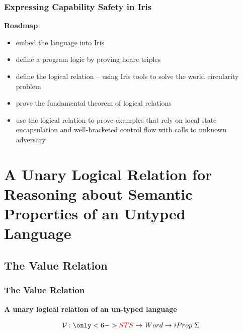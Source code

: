 \documentclass{beamer}
\newcommand{\bigsep}{\mathop{\scalebox{2.5}{\raisebox{-0.4ex}{$*$}}}}%
\begin{document}
\begin{frame}
\frametitle{Expressing Capability Safety in Iris}

\textbf{Roadmap}
	\begin{itemize}
		\item<2> embed the language into Iris
		\item<3> define a program logic by proving hoare triples
		\item<4> define the logical relation -- using Iris tools to solve the world circularity problem
		\item<5> prove the fundamental theorem of logical relations
		\item<6> use the logical relation to prove examples that rely on local state encapsulation and well-bracketed control flow with calls to unknown adversary
	\end{itemize}

\end{frame}


\section{A Unary Logical Relation for Reasoning about Semantic Properties of an Untyped Language}

\subsection{The Value Relation}

\begin{frame}[fragile]
\frametitle{The Value Relation}
\begin{center}
\textbf{A unary logical relation of an un-typed language}
\end{center}

$$\mathcal{V} : \only<6->{{\color{red}STS} \rightarrow~} 
			Word \rightarrow iProp~\Sigma $$
\\[1em]

\uncover<2->{
$$  \mathcal{V}\only<6->{{\color{red} (\Sigma)}}((\text{\tiny{RW}},g),b,e,a) \triangleq~ \bigsep_{a \in [b,e]} \fbox{$\exists w, a \mapsto_a [RW] w * \mathcal{V}\only<5->{{\color{red} (\Sigma)}}(w)$}$$}


\end{frame}
\end{document}
